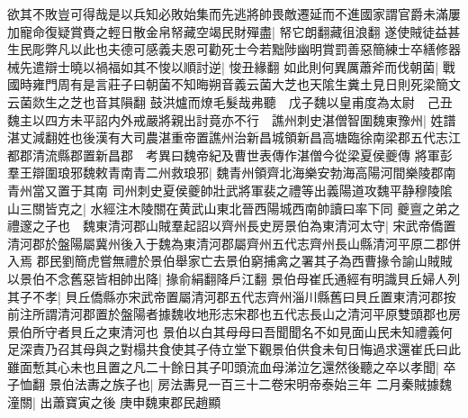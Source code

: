 欲其不敗豈可得哉是以兵知必敗始集而先逃將帥畏敵遷延而不進國家謂官爵未滿屢加寵命復疑賞賚之輕日散金帛帑藏空竭民財殫盡|{
	帑它朗翻藏徂浪翻}
遂使賊徒益甚生民彫弊凡以此也夫德可感義夫恩可勸死士今若黜陟幽明賞罰善惡簡練士卒繕修器械先遣辯士曉以禍福如其不悛以順討逆|{
	悛丑緣翻}
如此則何異厲蕭斧而伐朝菌|{
	戰國時雍門周有是言莊子曰朝菌不知晦朔音義云菌大芝也天隂生糞土見日則死梁簡文云菌欻生之芝也音其隕翻}
鼓洪爐而燎毛髮哉弗聽　戊子魏以皇甫度為太尉　己丑魏主以四方未平詔内外戒嚴將親出討竟亦不行　譙州刺史湛僧智圍魏東豫州|{
	姓譜湛丈減翻姓也後漢有大司農湛重帝置譙州治新昌城領新昌高塘臨徐南梁郡五代志江都郡清流縣郡置新昌郡　考異曰魏帝紀及曹世表傳作湛僧今從梁夏侯夔傳}
將軍彭羣王辯圍琅邪魏敕青南青二州救琅邪|{
	魏青州領齊北海樂安勃海高陽河間樂陵郡南青州當又置于其南}
司州刺史夏侯夔帥壯武將軍裴之禮等出義陽道攻魏平静穆陵隂山三關皆克之|{
	水經注木陵關在黄武山東北晉西陽城西南帥讀曰率下同}
夔亶之弟之禮邃之子也　魏東清河郡山賊羣起詔以齊州長史房景伯為東清河太守|{
	宋武帝僑置清河郡於盤陽屬冀州後入于魏為東清河郡屬齊州五代志齊州長山縣清河平原二郡併入焉}
郡民劉簡虎嘗無禮於景伯舉家亡去景伯窮捕禽之署其子為西曹掾令諭山賊賊以景伯不念舊惡皆相帥出降|{
	掾俞絹翻降戶江翻}
景伯母崔氏通經有明識貝丘婦人列其子不孝|{
	貝丘僑縣亦宋武帝置屬清河郡五代志齊州淄川縣舊曰貝丘置東清河郡按前注所謂清河郡置於盤陽者據魏收地形志宋郡也五代志長山之清河平原雙頭郡也房景伯所守者貝丘之東清河也}
景伯以白其母母曰吾聞聞名不如見面山民未知禮義何足深責乃召其母與之對榻共食使其子侍立堂下觀景伯供食未旬日悔過求還崔氏曰此雖面慙其心未也且置之凡二十餘日其子叩頭流血母涕泣乞還然後聽之卒以孝聞|{
	卒子恤翻}
景伯法夀之族子也|{
	房法夀見一百三十二卷宋明帝泰始三年}
二月秦賊據魏潼關|{
	出蕭寶寅之後}
庚申魏東郡民趙顯


